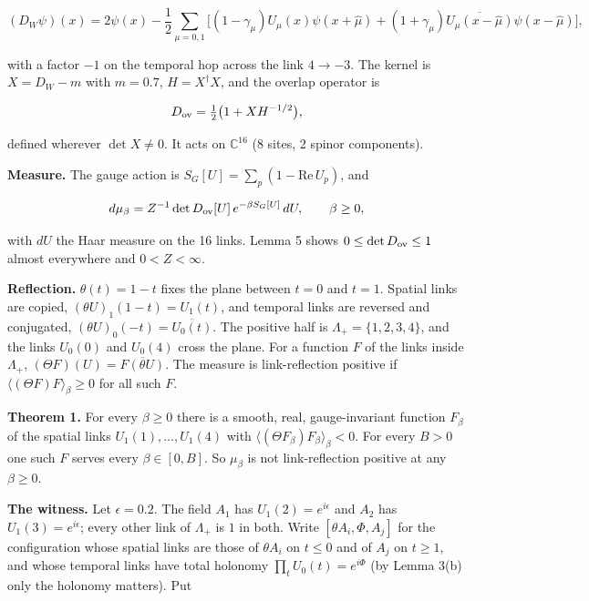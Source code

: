 \documentclass[11pt,a4paper]{article}
\begin{document}
\begin{equation*}
(D_W\psi)(x)=2\psi(x)-\frac12\sum_{\mu=0,1}\Big[(1-\gamma_\mu)U_\mu(x)\psi(x+\hat\mu)+(1+\gamma_\mu)\overline{U_\mu(x-\hat\mu)}\psi(x-\hat\mu)\Big],
\end{equation*}


with a factor $-1$ on the temporal hop across the link $4\to-3$. The kernel is $X=D_W-m$ with $m=0.7$, $H=X^\dagger X$, and the overlap operator is


\begin{equation*}
D_{\rm ov}=\tfrac12\big(1+XH^{-1/2}\big),
\end{equation*}


defined wherever $\det X\neq0$. It acts on $\mathbb{C}^{16}$ (8 sites, 2 spinor components).

{\bfseries\boldmath Measure.} The gauge action is $S_G[U]=\sum_p(1-\mathrm{Re}\,U_p)$, and


\begin{equation*}
d\mu_\beta=Z^{-1}\det D_{\rm ov}[U]\,e^{-\beta S_G[U]}\,dU,\qquad \beta\ge0,
\end{equation*}


with $dU$ the Haar measure on the 16 links. Lemma 5 shows $0\le\det D_{\rm ov}\le1$ almost everywhere and $0<Z<\infty$.

{\bfseries\boldmath Reflection.} $\theta(t)=1-t$ fixes the plane between $t=0$ and $t=1$. Spatial links are copied, $(\theta U)_1(1-t)=U_1(t)$, and temporal links are reversed and conjugated, $(\theta U)_0(-t)=\overline{U_0(t)}$. The positive half is $\Lambda_+=\{1,2,3,4\}$, and the links $U_0(0)$ and $U_0(4)$ cross the plane. For a function $F$ of the links inside $\Lambda_+$, $(\Theta F)(U)=\overline{F(\theta U)}$. The measure is link-reflection positive if $\langle(\Theta F)F\rangle_\beta\ge0$ for all such $F$.

{\bfseries\boldmath Theorem 1.} For every $\beta\ge0$ there is a smooth, real, gauge-invariant function $F_\beta$ of the spatial links $U_1(1),\dots,U_1(4)$ with $\langle(\Theta F_\beta)F_\beta\rangle_\beta<0$. For every $B>0$ one such $F$ serves every $\beta\in[0,B]$. So $\mu_\beta$ is not link-reflection positive at any $\beta\ge0$.

{\bfseries\boldmath The witness.} Let $\epsilon=0.2$. The field $A_1$ has $U_1(2)=e^{i\epsilon}$ and $A_2$ has $U_1(3)=e^{i\epsilon}$; every other link of $\Lambda_+$ is $1$ in both. Write $[\theta A_i,\Phi,A_j]$ for the configuration whose spatial links are those of $\theta A_i$ on $t\le0$ and of $A_j$ on $t\ge1$, and whose temporal links have total holonomy $\prod_tU_0(t)=e^{i\Phi}$ (by Lemma 3(b) only the holonomy matters). Put
\end{document}
